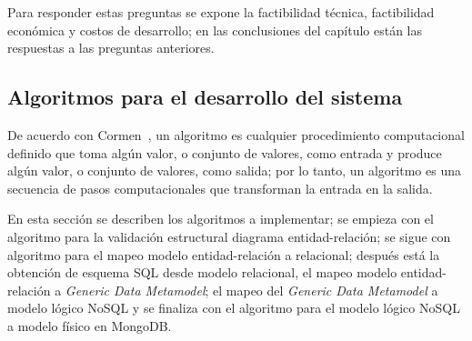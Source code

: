 Para responder estas preguntas se expone la factibilidad técnica, factibilidad económica y costos de desarrollo; en las conclusiones del capítulo están las respuestas a las preguntas anteriores.




%

\subsection{Algoritmos para el desarrollo del sistema}

De acuerdo con Cormen~\cite{cormen_introduction_2009}, un algoritmo es cualquier procedimiento computacional definido que toma algún valor, o conjunto de valores, como entrada y produce algún valor, o conjunto de valores, como salida; por lo tanto, un algoritmo es una secuencia de pasos computacionales que transforman la entrada en la salida.


En esta sección se describen los algoritmos a implementar; se empieza con el algoritmo para la validación estructural diagrama entidad-relación; se sigue con algoritmo para el mapeo modelo entidad-relación a relacional; después está la obtención de esquema SQL desde modelo relacional, el mapeo modelo entidad-relación a \textit{Generic Data Metamodel}; el mapeo del \textit{Generic Data Metamodel} a modelo lógico NoSQL y se finaliza con el algoritmo para el modelo lógico NoSQL a modelo físico en MongoDB.





